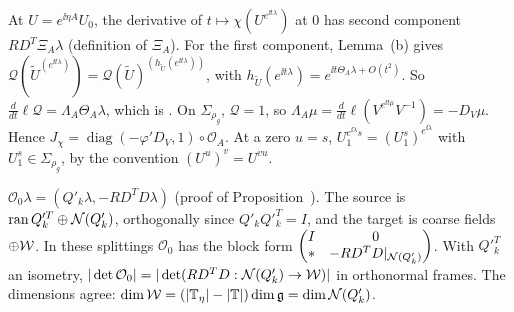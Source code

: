 \begin{detail}\label{d11a:E7}
\begin{step}
At $U=e^{\ii\eta A}U_0$, the derivative of $t\mapsto\chi(U^{e^{\ii t\lambda}})$ at $0$ has second component $RD^T\Xi_A\lambda$ (definition of $\Xi_A$). For the first component, Lemma~(b) gives $\mathcal Q(\tilde U^{(e^{\ii t\lambda})})=\mathcal Q(\tilde U)^{(h_{\tilde U}(e^{\ii t\lambda}))}$, with $h_{\tilde U}(e^{\ii t\lambda})=e^{\ii t\Theta_A\lambda+O(t^2)}$. So $\frac d{dt}\ell\mathcal Q=\Lambda_A\Theta_A\lambda$, which is . On $\Sigma_{\rho_g}$, $\mathcal Q=1$, so $\Lambda_A\mu=\frac d{dt}\ell(V^{e^{\ii t\mu}}V^{-1})=-D_V\mu$. Hence $J_\chi=\operatorname{diag}(-\varphi'D_V,1)\circ\mathcal O_A$. At a zero $u=s$, $U_1^{e^{\ii\lambda}s}=(U_1^s)^{e^{\ii\lambda}}$ with $U_1^s\in\Sigma_{\rho_g}$, by the convention $(U^u)^v=U^{vu}$.
\end{step}
\begin{step}
$\mathcal O_0\lambda=(Q'_k\lambda,-RD^TD\lambda)$ (proof of Proposition~). The source is $\operatorname{ran} Q'^T_k\oplus\mathcal N(Q'_k)$, orthogonally since $Q'_kQ'^T_k=I$, and the target is coarse fields $\oplus\mathcal W$. In these splittings $\mathcal O_0$ has the block form $\begin{pmatrix}I&0\\ *&-RD^TD|_{\mathcal N(Q'_k)}\end{pmatrix}$. With $Q'^T_k$ an isometry, $|\det\mathcal O_0|=|\det(RD^TD:\mathcal N(Q'_k)\to\mathcal W)|$ in orthonormal frames. The dimensions agree: $\dim\mathcal W=(|\mathbb T_\eta|-|\mathbb T|)\dim\mathfrak g=\dim\mathcal N(Q'_k)$.
\end{step}
\end{detail}

